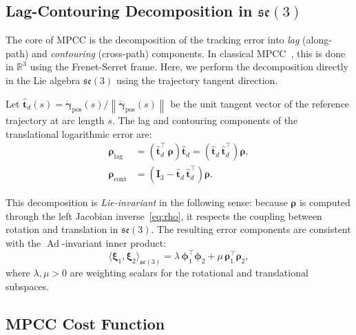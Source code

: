 \documentclass[journal]{IEEEtran}
\newcommand{\se}{\mathfrak{se}(3)}        %
\newcommand{\R}{\mathbb{R}}              %
\newcommand{\norm}[1]{\left\| #1 \right\|}
\DeclareMathOperator{\Ad}{Ad}
\begin{document}
\subsection{Lag-Contouring Decomposition in $\se$}

The core of MPCC is the decomposition of the tracking error into \emph{lag} (along-path) and \emph{contouring} (cross-path) components. In classical MPCC~\cite{liniger2015optimization}, this is done in $\R^3$ using the Frenet-Serret frame. Here, we perform the decomposition directly in the Lie algebra $\se$ using the trajectory tangent direction.

Let $\hat{\bm{t}}_d(s) = \dot{\bm{\gamma}}_{\text{pos}}(s) / \norm{\dot{\bm{\gamma}}_{\text{pos}}(s)}$ be the unit tangent vector of the reference trajectory at arc length $s$. The lag and contouring components of the translational logarithmic error are:
\begin{subequations}
\label{eq:lag_contour}
\begin{align}
    \bm{\rho}_{\text{lag}} &= \left(\hat{\bm{t}}_d^\top\, \bm{\rho}\right) \hat{\bm{t}}_d = \left(\hat{\bm{t}}_d\, \hat{\bm{t}}_d^\top\right) \bm{\rho}, \label{eq:rho_lag}\\
    \bm{\rho}_{\text{cont}} &= \left(\bm{I}_3 - \hat{\bm{t}}_d\, \hat{\bm{t}}_d^\top\right) \bm{\rho}. \label{eq:rho_cont}
\end{align}
\end{subequations}

This decomposition is \emph{Lie-invariant} in the following sense: because $\bm{\rho}$ is computed through the left Jacobian inverse~\eqref{eq:rho}, it respects the coupling between rotation and translation in $\se$. The resulting error components are consistent with the $\Ad$-invariant inner product:
\begin{equation}
    \langle \bm{\xi}_1, \bm{\xi}_2 \rangle_{\se} = \lambda\, \bm{\phi}_1^\top \bm{\phi}_2 + \mu\, \bm{\rho}_1^\top \bm{\rho}_2,
    \label{eq:ad_metric}
\end{equation}
where $\lambda, \mu > 0$ are weighting scalars for the rotational and translational subspaces.

\subsection{MPCC Cost Function}
\end{document}
